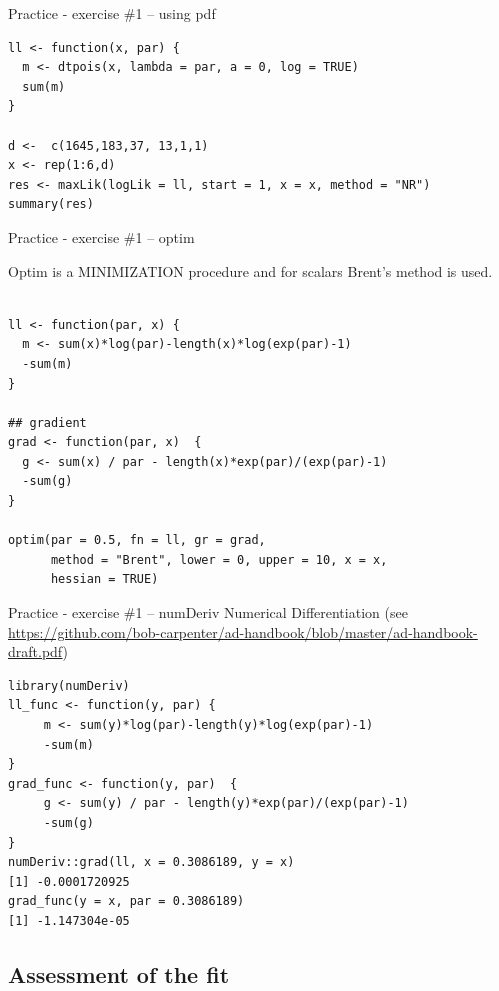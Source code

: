 \documentclass[10pt,ignorenonframetext,aspectratio=169]{beamer}
\begin{document}
\begin{frame}[fragile]{Practice - exercise \#1 -- using pdf}
    \begin{verbatim}
ll <- function(x, par) {
  m <- dtpois(x, lambda = par, a = 0, log = TRUE)
  sum(m)
}

d <-  c(1645,183,37, 13,1,1)
x <- rep(1:6,d)
res <- maxLik(logLik = ll, start = 1, x = x, method = "NR")
summary(res)
    \end{verbatim}
\end{frame}

\begin{frame}[fragile]{Practice - exercise \#1 -- optim}

Optim is a MINIMIZATION procedure and for scalars Brent's method is used. 

    \begin{verbatim}

ll <- function(par, x) {
  m <- sum(x)*log(par)-length(x)*log(exp(par)-1)
  -sum(m)
}

## gradient
grad <- function(par, x)  {
  g <- sum(x) / par - length(x)*exp(par)/(exp(par)-1)
  -sum(g)
}

optim(par = 0.5, fn = ll, gr = grad, 
      method = "Brent", lower = 0, upper = 10, x = x, 
      hessian = TRUE)
\end{verbatim}
\end{frame}




\begin{frame}[fragile]{Practice - exercise \#1 -- numDeriv}
Numerical Differentiation (see \url{https://github.com/bob-carpenter/ad-handbook/blob/master/ad-handbook-draft.pdf})

\begin{verbatim}
library(numDeriv)
ll_func <- function(y, par) {
     m <- sum(y)*log(par)-length(y)*log(exp(par)-1)
     -sum(m)
}
grad_func <- function(y, par)  {
     g <- sum(y) / par - length(y)*exp(par)/(exp(par)-1)
     -sum(g)
}
numDeriv::grad(ll, x = 0.3086189, y = x)
[1] -0.0001720925
grad_func(y = x, par = 0.3086189)
[1] -1.147304e-05
\end{verbatim}
\end{frame}


\subsection{Assessment of the fit}
\end{document}
